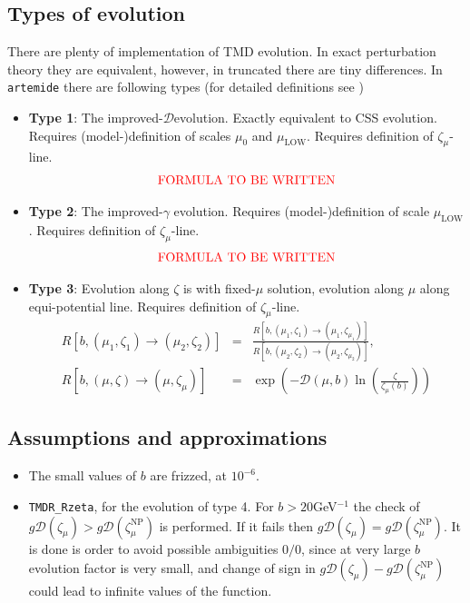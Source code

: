 \documentclass[prd,nofootinbib,eqsecnum,final]{revtex4}
\renewcommand{\(}{\left(}
\renewcommand{\)}{\right)}
\renewcommand{\[}{\left[}
\renewcommand{\]}{\right]}
\newcommand{\red}[1]{{\color[rgb]{1,0,0} #1}}
\begin{document}
\subsection{Types of evolution}

There are plenty of implementation of TMD evolution. In exact perturbation theory they are equivalent, however, in truncated there are tiny differences. In \texttt{artemide} there are following types (for detailed definitions see \cite{Scimemi:2018xaf})
\begin{itemize}
\item \textbf{Type 1}: The improved-$\mathcal{D}$evolution. Exactly equivalent to CSS evolution. Requires (model-)definition of scales $\mu_0$ and $\mu_{\text{LOW}}$. Requires definition of $\zeta_\mu$-line.
\begin{eqnarray}
\text{\red{FORMULA TO BE WRITTEN}}
\end{eqnarray}
\item \textbf{Type 2}: The improved-$\gamma$ evolution. Requires (model-)definition of scale $\mu_{\text{LOW}}$. Requires definition of $\zeta_\mu$-line.
\begin{eqnarray}
\text{\red{FORMULA TO BE WRITTEN}}
\end{eqnarray}
\item \textbf{Type 3}: Evolution along $\zeta$ is with fixed-$\mu$ solution, evolution along $\mu$ along equi-potential line. Requires definition of $\zeta_\mu$-line.
\begin{eqnarray}
R[b,(\mu_1,\zeta_1)\to(\mu_2,\zeta_2)]&=&\frac{R[b,(\mu_1,\zeta_1)\to(\mu_1,\zeta_{\mu_1})]}{R[b,(\mu_2,\zeta_2)\to(\mu_2,\zeta_{\mu_2})]},
\\
R[b,(\mu,\zeta)\to(\mu,\zeta_{\mu})]&=&\exp\(-\mathcal{D}(\mu,b)\ln\(\frac{\zeta}{\zeta_\mu(b)}\)\)
\end{eqnarray}
\end{itemize}

\subsection{Assumptions and approximations}

\begin{itemize}
\item The small values of $b$ are frizzed, at $10^{-6}$.
\item \texttt{TMDR{\_}Rzeta}, for the evolution of type 4. For $b>20$GeV$^{-1}$ the check of $g\mathcal{D}(\zeta_\mu)>g\mathcal{D}(\zeta_\mu^{\text{NP}})$ is performed. If it fails then $g\mathcal{D}(\zeta_\mu)=g\mathcal{D}(\zeta_\mu^{\text{NP}})$. It is done is order to avoid possible ambiguities $0/0$, since at very large $b$ evolution factor is very small, and change of sign in $g\mathcal{D}(\zeta_\mu)-g\mathcal{D}(\zeta_\mu^{\text{NP}})$ could lead to infinite values of the function.
\end{itemize}
\end{document}
